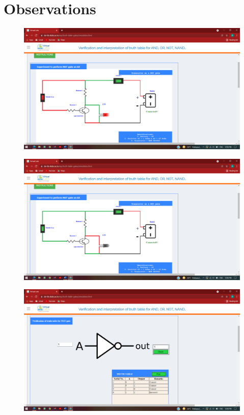 \section{Observations}
	\begin{figure}[h]
		\centering
		\includegraphics[width=0.9\linewidth]{img/exp3/4}
		\caption{}
		\label{fig:3:4}
	\end{figure}
		\begin{figure}[h]
		\centering
		\includegraphics[width=0.9\linewidth]{img/exp3/5}
		\caption{}
		\label{fig:3:5}
	\end{figure}
		\begin{figure}[h]
		\centering
		\includegraphics[width=0.9\linewidth]{img/exp3/6}
		\caption{}
		\label{fig:3:6}
	\end{figure}

